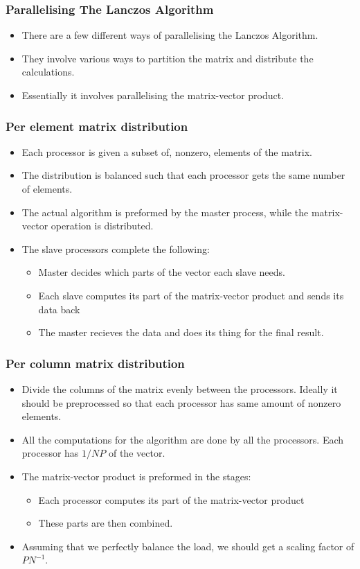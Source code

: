 \documentclass[pdf]{beamer}
\begin{document}
\begin{frame}
\frametitle{Parallelising The Lanczos Algorithm}
\begin{itemize}
\item There are a few different ways of parallelising the Lanczos Algorithm.
\item They involve various ways to partition the matrix and distribute the calculations.
\item Essentially it involves parallelising the matrix-vector product.
\end{itemize}
\end{frame}


\begin{frame}
\frametitle{Per element matrix distribution}
\begin{itemize}
\item Each processor is given a subset of, nonzero, elements of the matrix.
\item The distribution is balanced such that each processor gets the same number of elements.
\item The actual algorithm is preformed by the master process, while the matrix-vector operation is distributed.
\item The slave processors complete the following:
\begin{itemize}
\item Master decides which parts of the vector each slave needs.
\item Each slave computes its part of the matrix-vector product and sends its data back
\item The master recieves the data and does its thing for the final result.
\end{itemize}
\end{itemize}
\end{frame}


\begin{frame}
\frametitle{Per column matrix distribution}
\begin{itemize}
\item Divide the columns of the matrix evenly between the processors. Ideally it should be preprocessed so that each processor has same amount of nonzero elements.
\item All the computations for the algorithm are done by all the processors. Each processor has $1/NP$ of the vector.
\item The matrix-vector product is preformed in the stages:
\begin{itemize}
\item Each processor computes its part of the matrix-vector product
\item These parts are then combined.
\end{itemize}
\item Assuming that we perfectly balance the load, we should get a scaling factor of $PN^{-1}$.
\end{itemize}
\end{frame}
\end{document}

